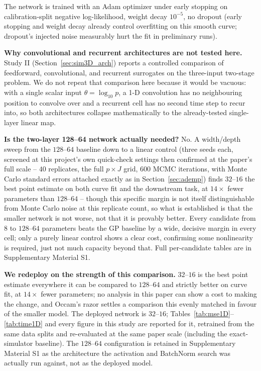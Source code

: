 \documentclass[sn-basic,iicol,pdflatex]{sn-jnl}
\begin{document}
The network is trained with an Adam optimizer under early stopping on
calibration-split negative log-likelihood, weight decay $10^{-5}$, no
dropout (early stopping and weight decay already control overfitting on this
smooth curve; dropout's injected noise measurably hurt the fit in
preliminary runs).

\noindent\textbf{Why convolutional and recurrent architectures are not tested here.}
Study II (Section~\ref{sec:sim3D_arch}) reports a controlled comparison of
feedforward, convolutional, and recurrent surrogates on the three-input
two-stage problem. We do not repeat that comparison here because it would be
vacuous: with a single scalar input $\theta=\log_{10}p$, a 1-D convolution has
no neighbouring position to convolve over and a recurrent cell has no second
time step to recur into, so both architectures collapse mathematically to the
already-tested single-layer linear map.

\noindent\textbf{Is the two-layer 128--64 network actually needed?} No. A
width/depth sweep from the $128$--$64$ baseline down to a linear control
(three seeds each, screened at this project's own quick-check settings then
confirmed at the paper's full scale -- $40$ replicates, the full $p\times J$
grid, $600$ MCMC iterations, with Monte Carlo standard errors attached
exactly as in Section~\ref{sec:ademp}) finds $32$--$16$ the best point
estimate on both curve fit and the downstream task, at $14\times$ fewer
parameters than $128$--$64$ -- though this specific margin is not itself
distinguishable from Monte Carlo noise at this replicate count, so what is
established is that the smaller network is not worse, not that it is
provably better. Every candidate from $8$ to $128$--$64$ parameters beats
the GP baseline by a wide, decisive margin in every cell; only a purely
linear control shows a clear cost, confirming some nonlinearity is required,
just not much capacity beyond that. Full per-candidate tables are in
Supplementary Material S1.

\textbf{We redeploy on the strength of this comparison.} $32$--$16$ is the
best point estimate everywhere it can be compared to $128$--$64$ and
strictly better on curve fit, at $14\times$ fewer parameters; no analysis in
this paper can show a cost to making the change, and Occam's razor settles a
comparison this evenly matched in favour of the smaller model. The deployed
network is $32$--$16$; Tables~\ref{tab:mse1D}--\ref{tab:time1D} and every
figure in this study are reported for it, retrained from the same data
splits and re-evaluated at the same paper scale (including the
exact-simulator baseline). The $128$--$64$ configuration is retained in
Supplementary Material S1 as the architecture the activation and BatchNorm
search was actually run against, not as the deployed model.
\end{document}
